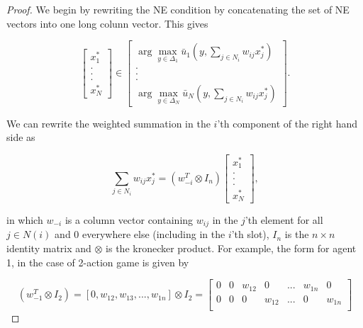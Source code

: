 \documentclass{article}
\theoremstyle{definition}
\begin{document}
	\begin{proof}
		We begin by rewriting the NE condition by concatenating the set of NE vectors into one long colunn vector. This gives

		\begin{equation}
			\begin{bmatrix}
				x_1^* \\ . \\ . \\ . \\ x_N^*
			\end{bmatrix} \in
			\begin{bmatrix}
			\arg\max_{y \in \Delta_1} \bar{u}_1(y, \sum_{j \in N_i} w_{ij} x_j^*) \\ . \\ . \\ . \\ \arg\max_{y \in \Delta_N} \bar{u}_N(y, \sum_{j \in N_i} w_{ij} x_j^*)
			\end{bmatrix}	.
		\end{equation}

		We can rewrite the weighted summation in the $i$'th component of the right hand side as 

		\begin{equation}
			\sum_{j \in N_i} w_{ij} x_j^* = (w_{-i}^T \otimes I_n) \begin{bmatrix}
				x_1^* \\ . \\ . \\ . \\ x_N^*
			\end{bmatrix},
		\end{equation}
	
		in which $w_{-i}$ is a column vector containing $w_{ij}$ in the $j$'th element for all $j \in N(i)$ and 0 everywhere else (including in the $i$'th slot), $I_n$ is the $n \times n$ identity matrix and $\otimes$ is the kronecker product. For example, the form for agent 1, in the case of 2-action game is given by

		\begin{equation}
			(w_{-1}^T \otimes I_2) = [0, w_{12}, w_{13}, ..., w_{1n}] \otimes I_2 = 
			\begin{bmatrix}
				0 & 0 & w_{12} & 0 & ... & w_{1n} & 0 \\
				0 & 0 & 0 & w_{12} & ... & 0 & w_{1n} \\
			\end{bmatrix}
		\end{equation}
		

\end{proof}
\end{document}
